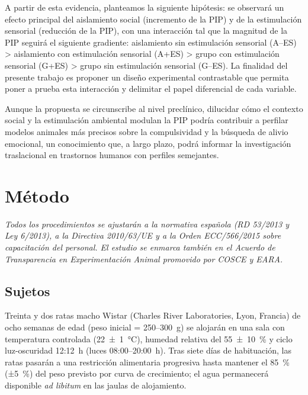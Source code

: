 \documentclass[12pt,a4paper]{article}
\begin{document}
\begin{multicols}{2}
A partir de esta evidencia, planteamos la siguiente hipótesis: se observará un efecto principal del aislamiento social (incremento de la PIP) y de la estimulación sensorial (reducción de la PIP), con una interacción tal que la magnitud de la PIP seguirá el siguiente gradiente: aislamiento sin estimulación sensorial (A--ES) > aislamiento con estimulación sensorial (A+ES) > grupo con estimulación sensorial (G+ES) > grupo sin estimulación sensorial (G–ES). La finalidad del presente trabajo es proponer un diseño experimental contrastable que permita poner a prueba esta interacción y delimitar el papel diferencial de cada variable.

Aunque la propuesta se circunscribe al nivel preclínico, dilucidar cómo el contexto social y la estimulación ambiental modulan la PIP podría contribuir a perfilar modelos animales más precisos sobre la compulsividad y la búsqueda de alivio emocional, un conocimiento que, a largo plazo, podrá informar la investigación traslacional en trastornos humanos con perfiles semejantes.


\section{Método}

\textit{Todos los procedimientos se ajustarán a la normativa española (RD 53/2013 y Ley 6/2013), a la Directiva 2010/63/UE y a la Orden ECC/566/2015 sobre capacitación del personal. El estudio se enmarca también en el Acuerdo de Transparencia en Experimentación Animal promovido por COSCE y EARA.}

\subsection*{Sujetos}

Treinta y dos ratas macho Wistar (Charles River Laboratories, Lyon, Francia) de ocho semanas de edad (peso inicial = 250–300~g) se alojarán en una sala con temperatura controlada (22~±~1~°C), humedad relativa del 55~±~10~\% y ciclo luz-oscuridad 12:12~h (luces 08:00–20:00~h). Tras siete días de habituación, las ratas pasarán a una restricción alimentaria progresiva hasta mantener el 85~\% (±5~\%) del peso previsto por curva de crecimiento; el agua permanecerá disponible \textit{ad libitum} en las jaulas de alojamiento.


\end{multicols}
\end{document}
